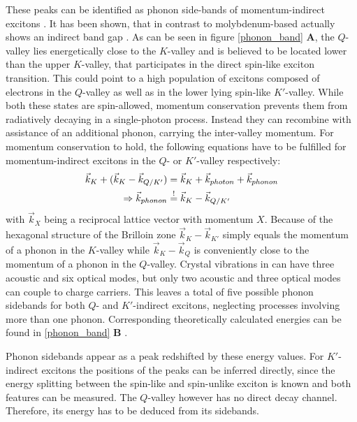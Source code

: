 These peaks can be identified as phonon side-bands of momentum-indirect excitons \cite{lindlau_identifying_2017}. It has been shown, that in contrast to molybdenum-based \tmds \wse actually shows an indirect band gap \cite{zhang_probing_2015, hsu_evidence_2017}. As can be seen in figure \ref{phonon_band} \textbf{A}, the $Q$-valley lies energetically close to the $K$-valley and is believed to be located lower than the upper $K$-valley, that participates in the direct spin-like exciton transition. This could point to a high population of excitons composed of electrons in the $Q$-valley as well as in the lower lying spin-like $K'$-valley. While both these states are spin-allowed, momentum conservation prevents them from radiatively decaying in a single-photon process. Instead they can recombine with assistance of an additional phonon, carrying the inter-valley momentum. For momentum conservation to hold, the following equations have to be fulfilled for momentum-indirect excitons in the $Q$- or $K'$-valley respectively:
\begin{align}
	\vec{k}_K + (\vec{k}_K - \vec{k}_{Q/K'}) &= \vec{k}_K + \vec{k}_{photon} + \vec{k}_{phonon}\\
	\Rightarrow \vec{k}_{phonon} &\overset{!}{=} \vec{k}_K - \vec{k}_{Q/K'}
\end{align}
with $\vec{k}_X$ being a reciprocal lattice vector with momentum $X$. Because of the hexagonal structure of the Brilloin zone $\vec{k}_K - \vec{k}_{K'}$ simply equals the momentum of a phonon in the $K$-valley while $\vec{k}_K - \vec{k}_{Q}$ is conveniently close to the momentum of a phonon in the $Q$-valley. Crystal vibrations in \tmds can have three acoustic and six optical modes, but only two acoustic and three optical modes can couple to charge carriers. This leaves a total of five possible phonon sidebands for both $Q$- and $K'$-indirect excitons, neglecting processes involving more than one phonon. Corresponding theoretically calculated energies can be found in \ref{phonon_band} \textbf{B} \cite{jin_intrinsic_2014}. 

Phonon sidebands appear as a peak redshifted by these energy values. For $K'$-indirect excitons the positions of the peaks can be inferred directly, since the energy splitting between the spin-like and spin-unlike exciton is known and both features can be measured. The $Q$-valley however has no direct decay channel. Therefore, its energy has to be deduced from its sidebands.



